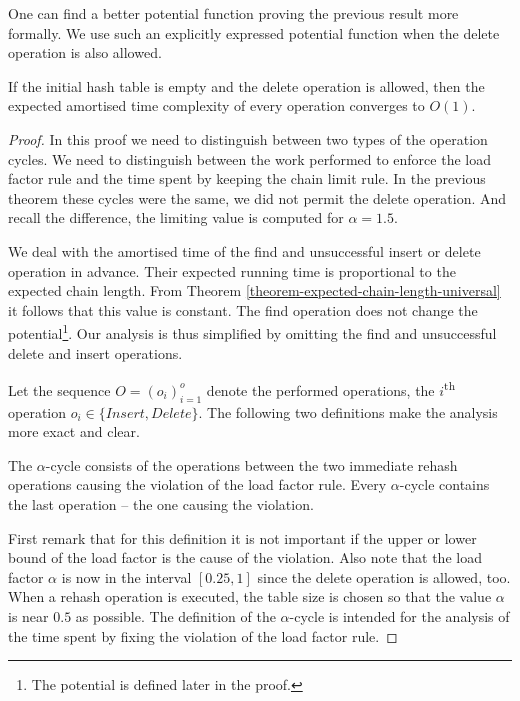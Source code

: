 One can find a better potential function proving the previous result more formally. We use such an explicitly expressed potential function when the delete operation is also allowed.

\begin{theorem}
If the initial hash table is empty and the delete operation is allowed, then the expected amortised time complexity of every operation converges to $O(1)$.
\end{theorem}
\begin{proof}
In this proof we need to distinguish between two types of the operation cycles. We need to distinguish between the work performed to enforce the load factor rule and the time spent by keeping the chain limit rule. In the previous theorem these cycles were the same, we did not permit the delete operation. And recall the difference, the limiting value is computed for $\alpha = 1.5$.

We deal with the amortised time of the find and unsuccessful insert or delete operation in advance. Their expected running time is proportional to the expected chain length. From Theorem \ref{theorem-expected-chain-length-universal} it follows that this value is constant. The find operation does not change the potential\footnote{The potential is defined later in the proof.}. Our analysis is thus simplified by omitting the find and unsuccessful delete and insert operations.

Let the sequence $O = (o_i)_{i=1}^o$ denote the performed operations, the $i$\textsuperscript{th} operation $o_i \in \lbrace Insert, Delete \rbrace$. The following two definitions make the analysis more exact and clear.

\begin{definition}
The $\alpha$-cycle consists of the operations between the two immediate rehash operations causing the violation of the load factor rule. Every $\alpha$-cycle contains the last operation -- the one causing the violation.
\end{definition}
First remark that for this definition it is not important if the upper or lower bound of the load factor is the cause of the violation. Also note that the load factor $\alpha$ is now in the interval $\left[0.25, 1\right]$ since the delete operation is allowed, too. When a rehash operation is executed, the table size is chosen so that the value $\alpha$ is near $0.5$ as possible. The definition of the $\alpha$-cycle is intended for the analysis of the time spent by fixing the violation of the load factor rule.


\end{proof}
